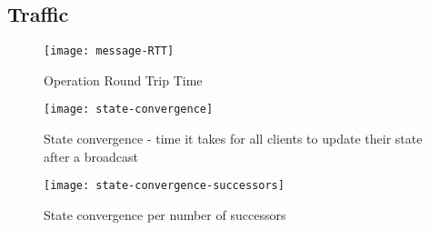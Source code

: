 \subsection{Traffic}
\label{sub:eval:traffic}

\begin{figure}
    \centering
    \texttt{[image: message-RTT]}
    \caption{Operation Round Trip Time}
    \label{fig:message-RTT}
\end{figure}


\begin{figure}
    \centering
    \texttt{[image: state-convergence]}
    \caption{State convergence - time it takes for all clients to update their state after a broadcast}
    \label{fig:state-convergence}
\end{figure}


\begin{figure}
    \centering
    \texttt{[image: state-convergence-successors]}
    \caption{State convergence per number of successors}
    \label{fig:state-convergence-successors}
\end{figure}
